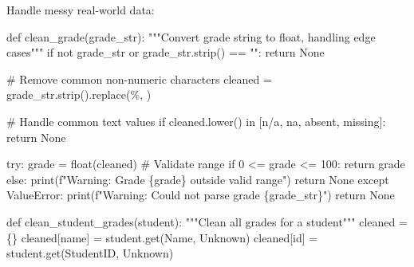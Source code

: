 \documentclass[
  letterpaper,
  DIV=11,
  numbers=noendperiod,
  oneside]{scrreprt}
\newenvironment{Shaded}{}{}
\newcommand{\BuiltInTok}[1]{\textcolor[rgb]{0.84,0.23,0.29}{#1}}
\newcommand{\CommentTok}[1]{\textcolor[rgb]{0.42,0.45,0.49}{#1}}
\newcommand{\ControlFlowTok}[1]{\textcolor[rgb]{0.84,0.23,0.29}{#1}}
\newcommand{\DecValTok}[1]{\textcolor[rgb]{0.00,0.36,0.77}{#1}}
\newcommand{\KeywordTok}[1]{\textcolor[rgb]{0.84,0.23,0.29}{#1}}
\newcommand{\NormalTok}[1]{\textcolor[rgb]{0.14,0.16,0.18}{#1}}
\newcommand{\OperatorTok}[1]{\textcolor[rgb]{0.14,0.16,0.18}{#1}}
\newcommand{\PreprocessorTok}[1]{\textcolor[rgb]{0.84,0.23,0.29}{#1}}
\newcommand{\SpecialCharTok}[1]{\textcolor[rgb]{0.00,0.36,0.77}{#1}}
\newcommand{\SpecialStringTok}[1]{\textcolor[rgb]{0.01,0.18,0.38}{#1}}
\newcommand{\StringTok}[1]{\textcolor[rgb]{0.01,0.18,0.38}{#1}}
\newcommand{\VariableTok}[1]{\textcolor[rgb]{0.89,0.38,0.04}{#1}}
\begin{document}
Handle messy real-world data:

\begin{Shaded}
\begin{Highlighting}[]
\KeywordTok{def}\NormalTok{ clean\_grade(grade\_str):}
    \CommentTok{"""Convert grade string to float, handling edge cases"""}
    \ControlFlowTok{if} \KeywordTok{not}\NormalTok{ grade\_str }\KeywordTok{or}\NormalTok{ grade\_str.strip() }\OperatorTok{==} \StringTok{""}\NormalTok{:}
        \ControlFlowTok{return} \VariableTok{None}
    
    \CommentTok{\# Remove common non{-}numeric characters}
\NormalTok{    cleaned }\OperatorTok{=}\NormalTok{ grade\_str.strip().replace(}\StringTok{\textquotesingle{}\%\textquotesingle{}}\NormalTok{, }\StringTok{\textquotesingle{}\textquotesingle{}}\NormalTok{)}
    
    \CommentTok{\# Handle common text values}
    \ControlFlowTok{if}\NormalTok{ cleaned.lower() }\KeywordTok{in}\NormalTok{ [}\StringTok{\textquotesingle{}n/a\textquotesingle{}}\NormalTok{, }\StringTok{\textquotesingle{}na\textquotesingle{}}\NormalTok{, }\StringTok{\textquotesingle{}absent\textquotesingle{}}\NormalTok{, }\StringTok{\textquotesingle{}missing\textquotesingle{}}\NormalTok{]:}
        \ControlFlowTok{return} \VariableTok{None}
    
    \ControlFlowTok{try}\NormalTok{:}
\NormalTok{        grade }\OperatorTok{=} \BuiltInTok{float}\NormalTok{(cleaned)}
        \CommentTok{\# Validate range}
        \ControlFlowTok{if} \DecValTok{0} \OperatorTok{\textless{}=}\NormalTok{ grade }\OperatorTok{\textless{}=} \DecValTok{100}\NormalTok{:}
            \ControlFlowTok{return}\NormalTok{ grade}
        \ControlFlowTok{else}\NormalTok{:}
            \BuiltInTok{print}\NormalTok{(}\SpecialStringTok{f"Warning: Grade }\SpecialCharTok{\{}\NormalTok{grade}\SpecialCharTok{\}}\SpecialStringTok{ outside valid range"}\NormalTok{)}
            \ControlFlowTok{return} \VariableTok{None}
    \ControlFlowTok{except} \PreprocessorTok{ValueError}\NormalTok{:}
        \BuiltInTok{print}\NormalTok{(}\SpecialStringTok{f"Warning: Could not parse grade \textquotesingle{}}\SpecialCharTok{\{}\NormalTok{grade\_str}\SpecialCharTok{\}}\SpecialStringTok{\textquotesingle{}"}\NormalTok{)}
        \ControlFlowTok{return} \VariableTok{None}

\KeywordTok{def}\NormalTok{ clean\_student\_grades(student):}
    \CommentTok{"""Clean all grades for a student"""}
\NormalTok{    cleaned }\OperatorTok{=}\NormalTok{ \{\}}
\NormalTok{    cleaned[}\StringTok{\textquotesingle{}name\textquotesingle{}}\NormalTok{] }\OperatorTok{=}\NormalTok{ student.get(}\StringTok{\textquotesingle{}Name\textquotesingle{}}\NormalTok{, }\StringTok{\textquotesingle{}Unknown\textquotesingle{}}\NormalTok{)}
\NormalTok{    cleaned[}\StringTok{\textquotesingle{}id\textquotesingle{}}\NormalTok{] }\OperatorTok{=}\NormalTok{ student.get(}\StringTok{\textquotesingle{}StudentID\textquotesingle{}}\NormalTok{, }\StringTok{\textquotesingle{}Unknown\textquotesingle{}}\NormalTok{)}
    

\end{Highlighting}
\end{Shaded}
\end{document}
